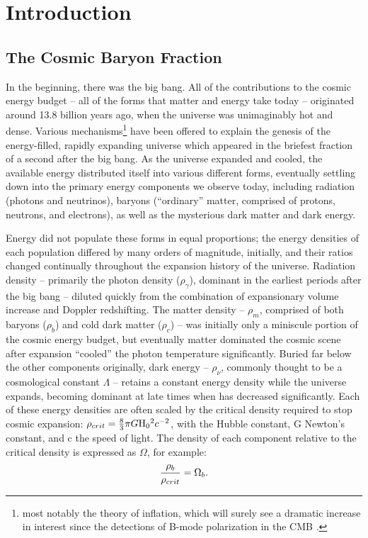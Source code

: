
\chapter{Introduction}
\label{c.Intro}
\section{The Cosmic Baryon Fraction}
\label{s.BaryonFraction}
In the beginning, there was the big bang. All of the contributions to
the cosmic energy budget -- all of the forms that matter and energy
take today -- originated around 13.8 billion years ago, when the
universe was unimaginably hot and dense. Various
mechanisms\footnote{most notably the theory of inflation, which will
  surely see a dramatic increase in interest since the detections of
  B-mode polarization in the CMB \citep{BICEP22014}.} have been
offered to explain the genesis of the energy-filled, rapidly expanding
universe which appeared in the briefest fraction of a second after the
big bang. As the universe expanded and cooled, the available energy
distributed itself into various different forms, eventually settling
down into the primary energy components we observe today, including
radiation (photons and neutrinos), baryons (``ordinary'' matter,
comprised of protons, neutrons, and electrons), as well as the
mysterious dark matter and dark energy. 

Energy did not populate these forms in equal proportions; the energy
densities of each population differed by many orders of magnitude,
initially, and their ratios changed continually throughout the
expansion history of the universe. Radiation density -- primarily the
photon density ($\rho_\gamma$), dominant in the earliest periods after
the big bang -- diluted quickly from the combination of expansionary
volume increase and Doppler redshifting. The matter density --
$\rho_m$, comprised of both baryons ($\rho_b$) and cold dark matter
($\rho_c$) -- was initially only a miniscule portion of the cosmic
energy budget, but eventually matter dominated the cosmic scene after
expansion ``cooled'' the photon temperature significantly. Buried far
below the other components originally, dark energy -- $\rho_\nu$,
commonly thought to be a cosmological constant $\Lambda$ -- retains a
constant energy density while the universe expands, becoming dominant
at late times when \rhom has decreased significantly. Each of these
energy densities are often scaled by the critical density required to
stop cosmic expansion: $\rho_{crit} = \frac{8}{3}\pi{}G\textrm{H\ensuremath{_0}}{}^2c^{-2}$,
with \Ho{} the Hubble constant, G Newton's constant, and c the speed
of light. The density of each component relative to the critical
density is expressed as $\Omega$, for example:
\begin{equation}
\frac{\rho_b}{\rho_{crit}} = \Omega_b.  \nonumber
\end{equation}

